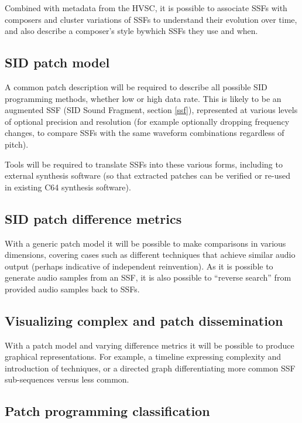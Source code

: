 \documentclass[10pt]{article}
\begin{document}
\begin{multicols*}{2}
Combined with metadata from the HVSC, it is possible to associate SSFs with composers and cluster variations of SSFs to understand their evolution over time, and also describe a composer's style bywhich SSFs they use and when.

\subsection{SID patch model}

A common patch description will be required to describe all possible SID programming methods, whether low or high data rate. This is likely to be an augmented SSF (SID Sound Fragment, section \ref{ssf}), represented at various levels of optional precision and resolution (for example optionally dropping frequency changes, to compare SSFs with the same waveform combinations regardless of pitch).

Tools will be required to translate SSFs into these various forms, including to external synthesis software (so that extracted patches can be verified or re-used in existing C64 synthesis software).

\subsection{SID patch difference metrics}

With a generic patch model it will be possible to make comparisons in various dimensions, covering cases such as different techniques that achieve similar audio output (perhaps indicative of independent reinvention). As it is possible to generate audio samples from an SSF, it is also possible to “reverse search” from provided audio samples back to SSFs.

\subsection{Visualizing complex and patch dissemination}

With a patch model and varying difference metrics it will be possible to produce graphical representations. For example, a timeline expressing complexity and introduction of techniques, or a directed graph differentiating more common SSF sub-sequences versus less common.

\subsection{Patch programming classification}


\end{multicols*}
\end{document}
